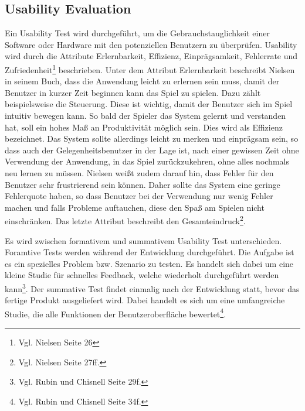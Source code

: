 	\subsection{Usability Evaluation}
		Ein Usability Test wird durchgeführt, um die Gebrauchstauglichkeit einer Software oder Hardware mit den potenziellen Benutzern zu überprüfen. Usability wird durch die Attribute Erlernbarkeit, Effizienz, Einprägsamkeit, Fehlerrate und Zufriedenheit\footnote{Vgl. Nielsen \cite{NielsenUI} Seite 26} beschrieben. Unter dem Attribut Erlernbarkeit beschreibt Nielsen in seinem Buch, dass die Anwendung leicht zu erlernen sein muss, damit der Benutzer in kurzer Zeit beginnen kann das Spiel zu spielen. Dazu zählt beispielsweise die Steuerung. Diese ist wichtig, damit der Benutzer sich im Spiel intuitiv bewegen kann. So bald der Spieler das System gelernt und verstanden hat, soll ein hohes Maß an Produktivität möglich sein. Dies wird als Effizienz bezeichnet. Das System sollte allerdings leicht zu merken und einprägsam sein, so dass auch der Gelegenheitsbenutzer in der Lage ist, nach einer gewissen Zeit ohne Verwendung der Anwendung, in das Spiel zurückzukehren, ohne alles nochmals neu lernen zu müssen. Nielsen weißt zudem darauf hin, dass Fehler für den Benutzer sehr frustrierend sein können. Daher sollte das System eine geringe Fehlerquote haben, so dass Benutzer bei der Verwendung nur wenig Fehler machen und falls Probleme auftauchen, diese den Spaß am Spielen nicht einschränken. Das letzte Attribut beschreibt den Gesamteindruck\footnote{Vgl. Nielsen \cite{NielsenUI} Seite 27ff.}.
		
		Es wird zwischen formativem und summativem Usability Test unterschieden. Foramtive Tests werden während der Entwicklung durchgeführt. Die Aufgabe ist es ein spezielles Problem bzw. Szenario zu testen. Es handelt sich dabei um eine kleine Studie für schnelles Feedback, welche wiederholt durchgeführt werden kann\footnote{Vgl. Rubin und Chisnell \cite{handbookUsability} Seite 29f.}. Der summative Test findet einmalig nach der Entwicklung statt, bevor das fertige Produkt ausgeliefert wird. Dabei handelt es sich um eine umfangreiche Studie, die alle Funktionen der Benutzeroberfläche bewertet\footnote{Vgl. Rubin und Chisnell \cite{handbookUsability} Seite 34f.}.
		
